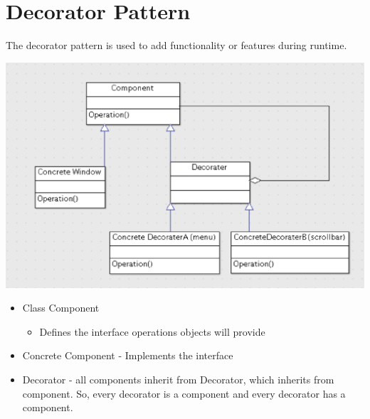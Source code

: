 \documentclass{article}
\begin{document}
\section{Decorator Pattern}
The decorator pattern is used to add functionality or features during runtime. 
\begin{center}
\includegraphics[scale=0.7]{lec9-1}
\end{center}
\begin{itemize}
\item Class Component 
\begin{itemize}
\item Defines the interface operations objects will provide 
\end{itemize}
\item Concrete Component - Implements the interface 
\item Decorator - all components inherit from Decorator, which inherits from component. So, every decorator is a component and every decorator has a component. 
\end{itemize}
\newpage
\end{document}
